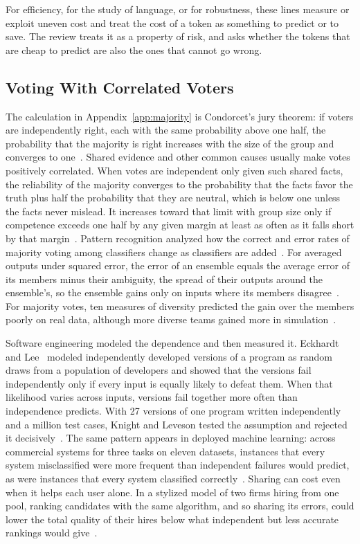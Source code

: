 \documentclass{ieeeaccess}
\begin{document}
For efficiency, for the study of language, or for robustness, these lines measure or exploit uneven cost and treat the cost of a token as something to predict or to save. The review treats it as a property of risk, and asks whether the tokens that are cheap to predict are also the ones that cannot go wrong.

\subsection{Voting With Correlated Voters}
The calculation in Appendix~\ref{app:majority} is Condorcet's jury theorem: if voters are independently right, each with the same probability above one half, the probability that the majority is right increases with the size of the group and converges to one~\cite{dietrich2023jury}. Shared evidence and other common causes usually make votes positively correlated. When votes are independent only given such shared facts, the reliability of the majority converges to the probability that the facts favor the truth plus half the probability that they are neutral, which is below one unless the facts never mislead. It increases toward that limit with group size only if competence exceeds one half by any given margin at least as often as it falls short by that margin~\cite{dietrich2023jury}. Pattern recognition analyzed how the correct and error rates of majority voting among classifiers change as classifiers are added~\cite{lam1997application}. For averaged outputs under squared error, the error of an ensemble equals the average error of its members minus their ambiguity, the spread of their outputs around the ensemble's, so the ensemble gains only on inputs where its members disagree~\cite{krogh1995neural}. For majority votes, ten measures of diversity predicted the gain over the members poorly on real data, although more diverse teams gained more in simulation~\cite{kuncheva2003measures}.

Software engineering modeled the dependence and then measured it. Eckhardt and Lee~\cite{eckhardt1985theoretical} modeled independently developed versions of a program as random draws from a population of developers and showed that the versions fail independently only if every input is equally likely to defeat them. When that likelihood varies across inputs, versions fail together more often than independence predicts. With 27 versions of one program written independently and a million test cases, Knight and Leveson tested the assumption and rejected it decisively~\cite{knight1986experimental}. The same pattern appears in deployed machine learning: across commercial systems for three tasks on eleven datasets, instances that every system misclassified were more frequent than independent failures would predict, as were instances that every system classified correctly~\cite{toups2023ecosystem}. Sharing can cost even when it helps each user alone. In a stylized model of two firms hiring from one pool, ranking candidates with the same algorithm, and so sharing its errors, could lower the total quality of their hires below what independent but less accurate rankings would give~\cite{kleinberg2021algorithmic}.
\end{document}
